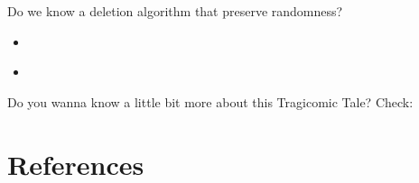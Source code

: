\documentclass{beamer}
\begin{document}
\begin{frame}
    Do we know a deletion algorithm that preserve randomness?
    \pause
    \begin{itemize}
        \item \cite{martinez1998randomized}
        \item \cite{seidel1996randomized}
    \end{itemize}
\end{frame}

\begin{frame}
    Do you wanna know a little bit more about this Tragicomic Tale? Check:

    \cite{panny2010deletions}
\end{frame}

\section{References}
\printbibliography
\frame{\titlepage}
\end{document}
